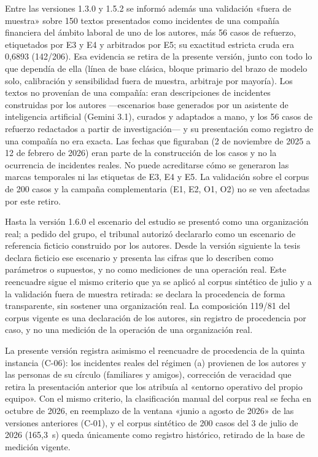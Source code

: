 Entre las versiones 1.3.0 y 1.5.2 se informó además una validación «fuera de muestra» sobre 150 textos presentados como incidentes de una compañía financiera del ámbito laboral de uno de los autores, más 56 casos de refuerzo, etiquetados por E3 y E4 y arbitrados por E5; su exactitud estricta cruda era 0,6893 (142/206). Esa evidencia se retira de la presente versión, junto con todo lo que dependía de ella (línea de base clásica, bloque primario del brazo de modelo solo, calibración y sensibilidad fuera de muestra, arbitraje por mayoría). Los textos no provenían de una compañía: eran descripciones de incidentes construidas por los autores ---escenarios base generados por un asistente de inteligencia artificial (Gemini 3.1), curados y adaptados a mano, y los 56 casos de refuerzo redactados a partir de investigación--- y su presentación como registro de una compañía no era exacta. Las fechas que figuraban (2 de noviembre de 2025 a 12 de febrero de 2026) eran parte de la construcción de los casos y no la ocurrencia de incidentes reales. No puede acreditarse cómo se generaron las marcas temporales ni las etiquetas de E3, E4 y E5. La validación sobre el corpus de 200 casos y la campaña complementaria (E1, E2, O1, O2) no se ven afectadas por este retiro.

Hasta la versión 1.6.0 el escenario del estudio se presentó como una organización real; a pedido del grupo, el tribunal autorizó declararlo como un escenario de referencia ficticio construido por los autores. Desde la versión siguiente la tesis declara ficticio ese escenario y presenta las cifras que lo describen como parámetros o supuestos, y no como mediciones de una operación real. Este reencuadre sigue el mismo criterio que ya se aplicó al corpus sintético de julio y a la validación fuera de muestra retirada: se declara la procedencia de forma transparente, sin sostener una organización real. La composición 119/81 del corpus vigente es una declaración de los autores, sin registro de procedencia por caso, y no una medición de la operación de una organización real.

La presente versión registra asimismo el reencuadre de procedencia de la quinta instancia (C-06): los incidentes reales del régimen (a) provienen de los autores y las personas de su círculo (familiares y amigos), corrección de veracidad que retira la presentación anterior que los atribuía al «entorno operativo del propio equipo». Con el mismo criterio, la clasificación manual del corpus real se fecha en octubre de 2026, en reemplazo de la ventana «junio a agosto de 2026» de las versiones anteriores (C-01), y el corpus sintético de 200 casos del 3 de julio de 2026 (165,3~s) queda únicamente como registro histórico, retirado de la base de medición vigente.

